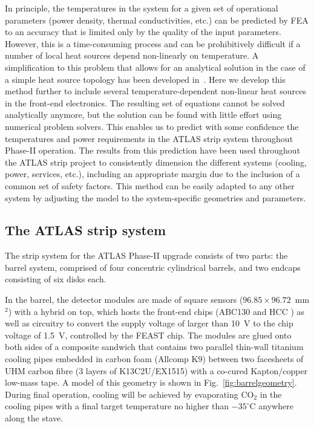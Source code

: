 In principle, the temperatures in the system for a given set of operational parameters (power density, thermal conductivities, etc.) can be predicted by FEA to an accuracy that is limited only by the quality of the input parameters. However, this is a time-consuming process and can be prohibitively difficult if a number of local heat sources depend non-linearly on temperature. A simplification to this problem that allows for an analytical solution in the case of a simple heat source topology has been developed in~\cite{Beck:2010zzd}. Here we develop this method further to include several temperature-dependent non-linear heat sources in the front-end electronics. The resulting set of equations cannot be solved analytically anymore, but the solution can be found with little effort using numerical problem solvers. This enables us to predict with some confidence the temperatures and power requirements in the ATLAS strip system throughout Phase-II operation. The results from this prediction have been used throughout the ATLAS strip project to consistently dimension the different systems (cooling, power, services, etc.), including an appropriate margin due to the inclusion of a common set of safety factors. This method can be easily adapted to any other system by adjusting the model to the system-specific geometries and parameters.

\subsection{The ATLAS strip system}
The strip system for the ATLAS Phase-II upgrade consists of two parts: the barrel system, comprised of four concentric cylindrical barrels, and two endcaps consisting of six disks each.

In the barrel, the detector modules are made of square sensors ($96.85\times 96.72$~mm$^2$) with a hybrid on top, which hosts the front-end chips (ABC130 \cite{abc130} and HCC \cite{Collaboration:2017mtb}) as well as circuitry to convert the supply voltage of larger than 10~V to the chip voltage of 1.5~V, controlled by the FEAST chip. The modules are glued onto both sides of a composite sandwich that contains two parallel thin-wall titanium cooling pipes embedded in carbon foam (Allcomp K9)  between two facesheets of UHM carbon fibre (3 layers of K13C2U/EX1515) with a co-cured Kapton/copper low-mass tape. A model of this geometry is shown in Fig.~\ref{fig:barrelgeometry}. During final operation, cooling will be achieved by evaporating CO$_2$ in the cooling pipes with a final target temperature no higher than $-35^\circ$C anywhere along the stave.

